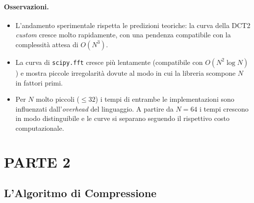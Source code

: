 \documentclass[11pt,a4paper]{article}
\makeatletter
\let\@origtexttt\texttt
\renewcommand{\texttt}[1]{{\def\_{\textunderscore\discretionary{}{}{}}\@origtexttt{#1}}}
\makeatother
\begin{document}
\paragraph{Osservazioni.}
\begin{itemize}
  \item L'andamento sperimentale rispetta le predizioni teoriche: la curva
        della DCT2 \emph{custom} cresce molto rapidamente, con una pendenza compatibile con la complessità attesa di $O(N^3)$.
  \item La curva di \texttt{scipy.fft} cresce più lentamente (compatibile con
        $O(N^2\log N)$) e mostra piccole irregolarità dovute al modo in cui la libreria scompone $N$ in fattori primi.
  \item Per $N$ molto piccoli ($\le 32$) i tempi di entrambe le implementazioni sono
        influenzati dall'\emph{overhead} del linguaggio. A partire da $N=64$ i tempi crescono in modo distinguibile e le curve si separano seguendo il rispettivo costo computazionale.
\end{itemize}

\section{PARTE 2}

\subsection{L'Algoritmo di Compressione}
\end{document}
